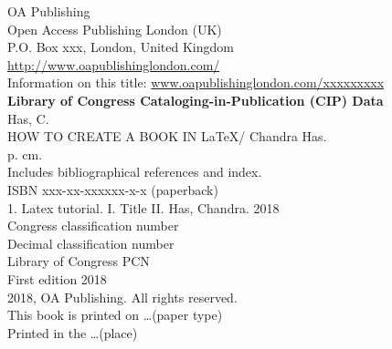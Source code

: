 
{	
	
 \raggedright
	OA Publishing\\
	Open Access Publishing London (UK)\\
	P.O. Box xxx, London, United Kingdom\\[5mm]
	
	\url{http://www.oapublishinglondon.com/}\\
	Information on this title: \url{www.oapublishinglondon.com/xxxxxxxxx}\\[5mm]
	
	{\bfseries Library of Congress Cataloging-in-Publication (CIP) Data}\\[5mm]
	
	Has, C.\\
	\hskip10mm HOW TO CREATE A BOOK IN \LaTeX/ Chandra Has.\\
	\hskip10mm  p. cm.\\
	\hskip10mm  Includes bibliographical references and index.\\
	\hskip10mm  ISBN xxx-xx-xxxxxx-x-x (paperback)\\
	\hskip10mm  1. Latex tutorial. I. Title II. Has, Chandra. 2018\\
	
	Congress classification number\\
	Decimal classification number\\
	Library of Congress PCN \\[5mm]
	
	First edition 2018\\[10mm]
	
	\textcopyright{} 2018, OA Publishing. All rights reserved.\\[3mm]
	
	
	This book is printed on \ldots (paper type)\\
	Printed in the \ldots (place)
	
}

\cleardoublepage









